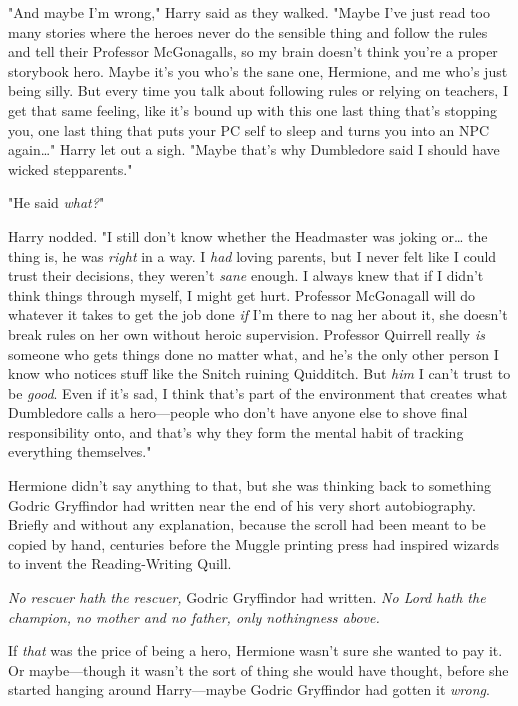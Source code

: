 "And maybe I'm wrong," Harry said as they walked. "Maybe I've just read too 
many stories where the heroes never do the sensible thing and follow the rules 
and tell their Professor McGonagalls, so my brain doesn't think you're a proper 
storybook hero. Maybe it's you who's the sane one, Hermione, and me who's just 
being silly. But every time you talk about following rules or relying on 
teachers, I get that same feeling, like it's bound up with this one last thing 
that's stopping you, one last thing that puts your PC self to sleep and turns 
you into an NPC again{\ldots}" Harry let out a sigh. "Maybe that's why 
Dumbledore said I should have wicked stepparents."

"He said \emph{what?}"

Harry nodded. "I still don't know whether the Headmaster was joking or{\ldots} 
the thing is, he was \emph{right} in a way. I \emph{had} loving parents, but I 
never felt like I could trust their decisions, they weren't \emph{sane} enough. 
I always knew that if I didn't think things through myself, I might get hurt. 
Professor McGonagall will do whatever it takes to get the job done \emph{if} 
I'm there to nag her about it, she doesn't break rules on her own without 
heroic supervision. Professor Quirrell really \emph{is} someone who gets things 
done no matter what, and he's the only other person I know who notices stuff 
like the Snitch ruining Quidditch. But \emph{him} I can't trust to be 
\emph{good}. Even if it's sad, I think that's part of the environment that 
creates what Dumbledore calls a hero---people who don't have anyone else to 
shove final responsibility onto, and that's why they form the mental habit of 
tracking everything themselves."

Hermione didn't say anything to that, but she was thinking back to something 
Godric Gryffindor had written near the end of his very short autobiography. 
Briefly and without any explanation, because the scroll had been meant to be 
copied by hand, centuries before the Muggle printing press had inspired wizards 
to invent the Reading-Writing Quill.

\emph{No rescuer hath the rescuer,} Godric Gryffindor had written. \emph{No 
Lord hath the champion, no mother and no father, only nothingness above.}

If \emph{that} was the price of being a hero, Hermione wasn't sure she wanted 
to pay it. Or maybe---though it wasn't the sort of thing she would have 
thought, before she started hanging around Harry---maybe Godric Gryffindor had 
gotten it \emph{wrong}.

